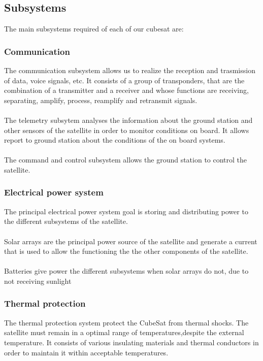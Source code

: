 \subsection{Subsystems}

The main subsystems required of each of our cubesat are:

\subsubsection{Communication}
The communication subsystem allows us to realize the reception and trasmission of data, voice signals, etc. It consists of a group of transponders, that are the combination of a transmitter and a receiver and whose functions are receiving, separating, amplify, process, reamplify and retransmit signals.
	\paragraph{} 
	The telemetry subsytem analyses the information about the ground station and other sensors of the satellite in 	order to monitor conditions on board. It allows report to ground station about the conditions of the on board 			systems.
	\paragraph{} 
	The command and control subsystem allows the ground station to control the satellite.
	
\subsubsection{Electrical power system}
The principal electrical power system  goal is storing and distributing power to the different subsystems of the satellite.
	\paragraph{}
	Solar arrays are the principal power source of the satellite and generate a current that is used to allow the 			functioning the the other components of the satellite.
	\paragraph{}
	Batteries give power the different subsystems when solar arrays do not, due to not receiving sunlight
	
\subsubsection{Thermal protection}
The thermal protection system protect the CubeSat from thermal shocks. The satellite must remain in a optimal range of temperatures,despite the external temperature. It consists of various insulating materials and thermal conductors in order to maintain it within acceptable temperatures.

